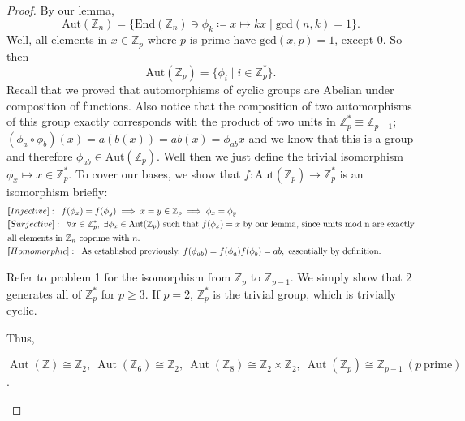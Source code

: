 \documentclass[addpoints,10pt]{exam}
\theoremstyle{plain}
\theoremstyle{definition}
\theoremstyle{plain}
\theoremstyle{plain}
\theoremstyle{definition}
\newcommand{\ZZ}{\ensuremath{\mathbb{Z}}}
\begin{document}
\begin{proof}
By our lemma, $$\mathrm{Aut}(\ZZ_{n})=\{\mathrm{End}(\ZZ_{n})\ni\phi_{k}\coloneqq x\mapsto kx\mid \mathrm{gcd}(n,k)=1\}.$$
Well, all elements in $x\in \ZZ_{p}$ where $p$ is prime have $\mathrm{gcd}(x,p)=1$, except $0$. So then 
  $$\mathrm{\mathrm{Aut}}(\ZZ_{p})=\{\phi_{i}\mid i\in \ZZ^{*}_{p}\}.$$
Recall that we proved that automorphisms of cyclic groups are Abelian under composition of functions. Also notice that the composition of two automorphisms of this group exactly corresponds with the product of two units in $\ZZ^{*}_{p}\equiv \ZZ_{p-1}$; $(\phi_{a}\circ \phi_{b})(x)=a(b(x))=ab(x)=\phi_{ab}x$ and we know that this is a group and therefore $\phi_{ab}\in \mathrm{Aut}(\ZZ_{p})$. Well then we just define the trivial isomorphism $\phi_{x}\mapsto x\in \ZZ_{p}^{*}$. To cover our bases, we show that $f:\mathrm{Aut}(\ZZ_{p})\to \ZZ_{p}^{*}$ is an isomorphism briefly:
\begin{align*}
&\textbf[Injective]:\;\;f(\phi_{x})=f(\phi_{y})\implies x=y\in \ZZ_{p} \implies\phi_{x}=\phi_{y}\\
&\textbf[Surjective]:\;\;\forall x\in \ZZ_{p}^{*},\;\exists \phi_{x}\in \mathrm{Aut}(\ZZ_{p})\text{ such that }f(\phi_{x})=x\text{ by our lemma, since units mod n are exactly}\\ 
&\text{all elements in $\ZZ_{n}$ coprime with $n$.}\\
&\textbf[Homomorphic]:\;\;\text{As established previously, }f(\phi_{ab})=f(\phi_{a})f(\phi_{b})=ab,\text{ essentially by definition.}
\end{align*}

Refer to problem 1 for the isomorphism from $\ZZ_{p}$ to $\ZZ_{p-1}$. We simply show that $2$ generates all of $\ZZ_{p}^{*}$ for $p\geq 3$. If $p=2$, $\ZZ_{p}^{*}$ is the trivial group, which is trivially cyclic.

Thus,

\begin{center}
$\operatorname{Aut}(\mathbb{Z}) \cong \mathbb{Z}_2,\ 
  \operatorname{Aut}(\mathbb{Z}_6)\cong \mathbb{Z}_2,\
  \operatorname{Aut}(\mathbb{Z}_8)\cong \mathbb{Z}_2 \times \mathbb{Z}_2,\
  \operatorname{Aut}(\mathbb{Z}_p)\cong \mathbb{Z}_{p-1}\ (p\ \text{prime})$.
\end{center}

\end{proof}
\setcounter{thm}{7}   %
\end{document}
